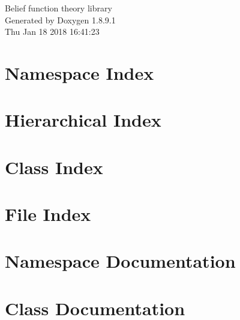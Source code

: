 \documentclass[twoside]{book}
\newcommand{\+}{\discretionary{\mbox{\scriptsize$\hookleftarrow$}}{}{}}
\newcommand{\clearemptydoublepage}{%
  \newpage{\pagestyle{empty}\cleardoublepage}%
}
\begin{document}
\hypersetup{pageanchor=false,
             bookmarks=true,
             bookmarksnumbered=true,
             pdfencoding=unicode
            }
\begin{titlepage}
\vspace*{7cm}
\begin{center}%
{\Large Belief function theory library }\\
\vspace*{1cm}
{\large Generated by Doxygen 1.8.9.1}\\
\vspace*{0.5cm}
{\small Thu Jan 18 2018 16:41:23}\\
\end{center}
\end{titlepage}
\clearemptydoublepage
\tableofcontents
\clearemptydoublepage
{}
\hypersetup{pageanchor=true}

\chapter{Namespace Index}

\chapter{Hierarchical Index}

\chapter{Class Index}

\chapter{File Index}

\chapter{Namespace Documentation}



\chapter{Class Documentation}























\end{document}
